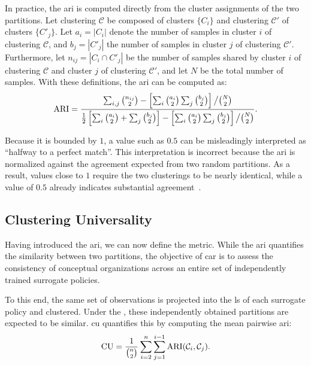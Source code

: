 In practice, the \gls{ari} is computed directly from the cluster assignments of the two partitions.
Let clustering \(\mathcal{C}\) be composed of clusters \(\{C_i\}\) and clustering \(\mathcal{C}'\) of clusters \(\{C'_j\}\).
Let \(a_i = |C_i|\) denote the number of samples in cluster \(i\) of clustering \(\mathcal{C}\), and \(b_j = |C'_j|\) the number of samples in cluster \(j\) of clustering \(\mathcal{C}'\).
Furthermore, let \(n_{ij} = |C_i \cap C'_j|\) be the number of samples shared by cluster \(i\) of clustering \(\mathcal{C}\) and cluster \(j\) of clustering \(\mathcal{C}'\), and let \(N\) be the total number of samples.
With these definitions, the \gls{ari} can be computed as:
\[
\operatorname{ARI} =
\frac{
\sum_{i,j} \binom{n_{ij}}{2}
-
\left[
\sum_i \binom{a_i}{2}
\sum_j \binom{b_j}{2}
\right]
\big/ \binom{N}{2}
}{
\frac{1}{2}
\left[
\sum_i \binom{a_i}{2}
+
\sum_j \binom{b_j}{2}
\right]
-
\left[
\sum_i \binom{a_i}{2}
\sum_j \binom{b_j}{2}
\right]
\big/ \binom{N}{2}
}.
\]

Because it is bounded by $1$, a value such as $0.5$ can be misleadingly interpreted as \enquote{halfway to a perfect match}.
This interpretation is incorrect because the \gls{ari} is normalized against the agreement expected from two random partitions.
As a result, values close to $1$ require the two clusterings to be nearly identical, while a value of $0.5$ already indicates substantial agreement~\parencite{amezquita2020orchestrating}.

\subsection{Clustering Universality}
\label{subsec:clustering_universality}

Having introduced the \gls{ari}, we can now define the  metric.
While the \gls{ari} quantifies the similarity between two partitions, the objective of \gls{car} is to assess the consistency of conceptual organizations across an entire set of independently trained surrogate policies.

To this end, the same set of observations is projected into the \gls{ls} of each surrogate policy and clustered.
Under the \RepresentationConvergenceHypothesisName, these independently obtained partitions are expected to be similar.
\gls{cu} quantifies this by computing the mean pairwise \gls{ari}:
\begin{align}
    \mathrm{CU}
    =
    \frac{1}{\binom{n}{2}}
    \sum_{i=2}^{n}
    \sum_{j=1}^{i-1}
    \operatorname{ARI}(\mathcal{C}_{i}, \mathcal{C}_{j}).
\end{align}

